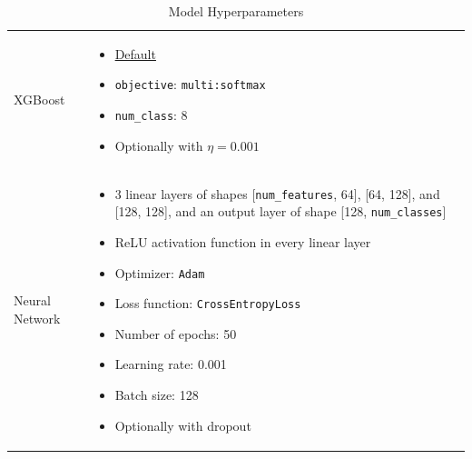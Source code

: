 \documentclass{article}
\begin{document}
\begin{table}[htbp]
\begin{tabular}{l p{}}
        XGBoost & \begin{itemize}
            \item \href{https://xgboost.readthedocs.io/en/stable/parameter.html}{Default}
            \item \texttt{objective}: \texttt{multi:softmax}
            \item \texttt{num\_class}: 8
            \item Optionally with \(\eta=0.001\)
        \end{itemize} \\[3pt]
        Neural Network & \begin{itemize}
            \item 3 linear layers of shapes [\texttt{num\_features}, 64], [64, 128], and [128, 128], and an output layer of shape [128, \texttt{num\_classes}]
            \item ReLU activation function in every linear layer
            \item Optimizer: \texttt{Adam}
            \item Loss function: \texttt{CrossEntropyLoss}
            \item Number of epochs: 50
            \item Learning rate: 0.001
            \item Batch size: 128
            \item Optionally with dropout
        \end{itemize} \\
        \bottomrule
    \end{tabular}
    \caption{Model Hyperparameters}
\end{table}
\end{document}
